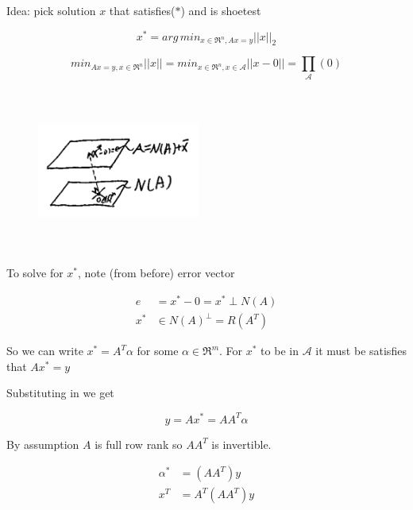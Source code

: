 Idea: pick solution $x$ that satisfies($*$) and is shoetest

\begin{equation*}
x^* = arg \, min_{x\in \Re^n, Ax = y}||x||_2
\end{equation*}

\begin{equation*}
min_{Ax = y, x\in \Re^n}||x|| = min_{x\in \Re^n, x\in \mathcal{A}}||x - 0|| = \prod_{\mathcal{A}}(0)
\end{equation*}


\begin{figure}
	\centering
	\includegraphics[width=2.1in,height=2.1in]{figures/ch06/figure3.png}
\end{figure}

To solve for $x^*$, note (from before) error vector 

\begin{align*}
e &= x^* - 0 = x^* \perp N(A)\\
x^* &\in N(A)^{\perp} = R(A^T)
\end{align*}

So we can write $x^* = A^T\alpha$ for some $\alpha \in \Re^m$. 
For $x^*$ to be in $\mathcal{A}$ it must be satisfies that $Ax^* = y$

Substituting in we get 

\begin{equation*}
y = Ax^* = AA^T\alpha
\end{equation*}

By assumption $A$ is full row rank so $AA^T$ is invertible.

\begin{align*}
\alpha^* &= (AA^T)y\\
x^T &= A^T(AA^T)y
\end{align*}

